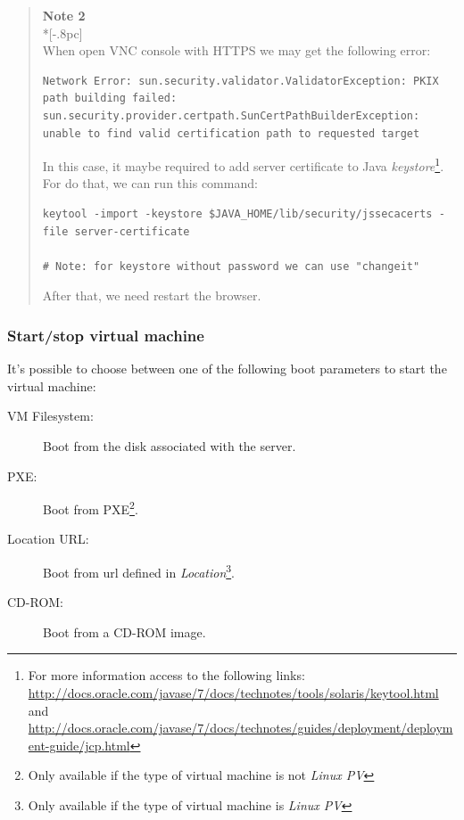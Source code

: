 \begin{quote}
	{\large \bf Note 2} \\*[-.8pc]
	\underline{\hspace{6in}} \\

    When open VNC console with HTTPS we may get the following error:

\begin{verbatim}
Network Error: sun.security.validator.ValidatorException: PKIX path building failed: sun.security.provider.certpath.SunCertPathBuilderException: unable to find valid certification path to requested target
\end{verbatim}

    In this case, it maybe required to add server certificate to Java \emph{keystore}\footnote{For more information access to the following links: \url{http://docs.oracle.com/javase/7/docs/technotes/tools/solaris/keytool.html} and \url{http://docs.oracle.com/javase/7/docs/technotes/guides/deployment/deployment-guide/jcp.html} }.
    For do that, we can run this command:

\begin{verbatim}
keytool -import -keystore $JAVA_HOME/lib/security/jssecacerts -file server-certificate

# Note: for keystore without password we can use "changeit"
\end{verbatim}

    After that, we need restart the browser.

\end{quote}

\subsubsection{Start/stop virtual machine}
\label{sec:start_server}

It's possible to choose between one of the following boot parameters to start the virtual machine:
\begin{description}
    \item[VM Filesystem:] Boot from the disk associated with the server.
    \item[PXE:] Boot from PXE\footnote{Only available if the type of virtual machine is not \emph{Linux PV}\label{foot:notpv}}.
    \item[Location URL:] Boot from url defined in \emph{Location}\footnote{Only available if the type of virtual machine is \emph{Linux PV}}.
	\item[CD-ROM:] Boot from a CD-ROM image.
    	 
\end{description}

